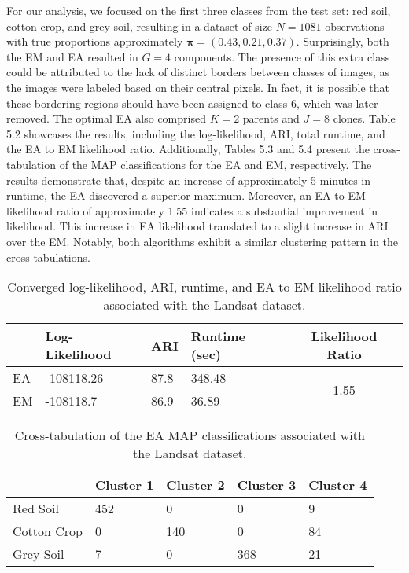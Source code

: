 \documentclass[12pt]{report}
\begin{document}
For our analysis, we focused on the first three classes from the test set: red soil, cotton crop, and grey soil, resulting in a dataset of size $N = 1081$ observations with true proportions approximately $\bm{\pi} = (0.43, 0.21, 0.37)$. Surprisingly, both the EM and EA resulted in $G=4$ components. The presence of this extra class could be attributed to the lack of distinct borders between classes of images, as the images were labeled based on their central pixels. In fact, it is possible that these bordering regions should have been assigned to class 6, which was later removed. The optimal EA also comprised $K=2$ parents and $J=8$ clones. Table 5.2 showcases the results, including the log-likelihood, ARI, total runtime, and the EA to EM likelihood ratio. Additionally, Tables 5.3 and 5.4 present the cross-tabulation of the MAP classifications for the EA and EM, respectively. The results demonstrate that, despite an increase of approximately 5 minutes in runtime, the EA discovered a superior maximum. Moreover, an EA to EM likelihood ratio of approximately 1.55 indicates a substantial improvement in likelihood. This increase in EA likelihood translated to a slight increase in ARI over the EM. Notably, both algorithms exhibit a similar clustering pattern in the cross-tabulations.


\newpage
\begin{table}[!htbp]
  \caption{Converged log-likelihood, ARI, runtime, and EA to EM likelihood ratio associated with the Landsat dataset.}
    \vspace{0.5cm}
  \begin{tabularx}{\textwidth}{l *{3}{X}c}
  \toprule
    &\textbf{Log-Likelihood}& \textbf{ARI} & \textbf{Runtime (sec)} & \textbf{Likelihood Ratio} \\
  \midrule
   EA & -108118.26     & 87.8 &  348.48 & \multirow{2}{*}{1.55}\\
  EM & -108118.7          & 86.9 & 36.89    \\
  \bottomrule
  \end{tabularx}
\end{table}

\begin{table}[!htbp]
  \caption{Cross-tabulation of the EA MAP classifications associated with the Landsat dataset.}
    \vspace{0.5cm}
  \begin{tabularx}{\textwidth}{l *{4}{X}}
  \toprule
   &\textbf{Cluster 1}  & \textbf{Cluster 2}  & \textbf{Cluster 3}  & \textbf{Cluster 4}   \\
  \midrule
  Red Soil & 	452 & 0 & 0 & 9\\
  Cotton Crop &0 & 140 &  0 & 84 \\
   Grey Soil &   7 & 0 &  368  & 21\\
  \bottomrule
  \end{tabularx}
\end{table}
\end{document}

